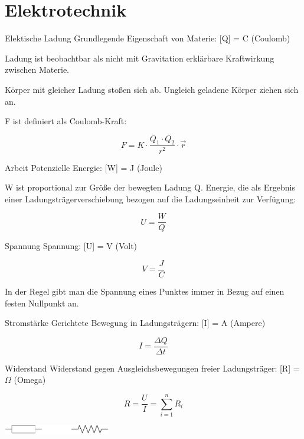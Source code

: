 \section{Elektrotechnik}

\begin{defi}{Elektische Ladung}
    Grundlegende Eigenschaft von Materie: [Q] = C (Coulomb)

    Ladung ist beobachtbar als nicht mit Gravitation erklärbare Kraftwirkung zwischen Materie.

    Körper mit gleicher Ladung stoßen sich ab.
    Ungleich geladene Körper ziehen sich an.

    F ist definiert als Coulomb-Kraft:

    \[
        F = K \cdot \frac{Q_1 \cdot Q_2}{r^2} \cdot \vec{r}
    \]
\end{defi}

\begin{defi}{Arbeit}
    Potenzielle Energie: [W] = J (Joule)

    W ist proportional zur Größe der bewegten Ladung Q.
    Energie, die als Ergebnis einer Ladungsträgerverschiebung bezogen auf die Ladungseinheit zur Verfügung:

    \[
        U = \frac{W}{Q}
    \]
\end{defi}

\begin{defi}{Spannung}
    Spannung: [U] = V (Volt)

    \[
        V = \frac{J}{C}
    \]

    In der Regel gibt man die Spannung eines Punktes immer in Bezug auf einen festen Nullpunkt an.
\end{defi}

\begin{defi}{Stromstärke}
    Gerichtete Bewegung in Ladungsträgern: [I] = A (Ampere)

    \[
        I = \frac{\Delta Q}{\Delta t}
    \]
\end{defi}

\begin{defi}{Widerstand}
    Widerstand gegen Ausgleichsbewegungen freier Ladungsträger: [R] = $\Omega$ (Omega)

    \[
        R = \frac{U}{I} = \sum_{i = 1}^n R_i
    \]

    \begin{center}
        \includegraphics[width=0.35\textwidth]{includes/figures/defi_widerstand.pdf}
    \end{center}
\end{defi}

